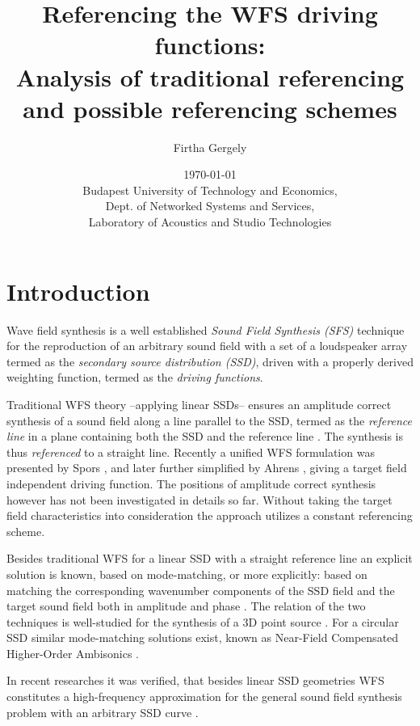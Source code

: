 \documentclass[12pt,a4paper]{article}
\title{Referencing the WFS driving functions:\\
Analysis of traditional referencing and possible referencing schemes}
\date{\today \\
Budapest University of Technology and Economics, \\ Dept. of Networked Systems and Services, \\ Laboratory of Acoustics and Studio Technologies}
\author{Firtha Gergely}
\begin{document}
\maketitle

\section{Introduction}

Wave field synthesis is a well established \emph{Sound Field Synthesis (SFS)} technique for the reproduction of an arbitrary sound field with a set of a loudspeaker array termed as the \emph{secondary source distribution (SSD)}, driven with a properly derived weighting function, termed as the \emph{driving functions}. 

Traditional WFS theory --applying linear SSDs-- ensures an amplitude correct synthesis of a sound field along a line parallel to the SSD, termed as the \emph{reference line} in a plane containing both the SSD and the reference line \cite{Berkhout1993:Acoustic_control_by_WFS, Berkhout1988, Verheijen1997:phd, Vogel1993:phd, Start1997:phd}. The synthesis is thus \emph{referenced} to a straight line. Recently a unified WFS formulation was presented by Spors \cite{Spors2008:WFSrevisited}, and later further simplified by Ahrens \cite{Ahrens2010phd, Ahrens2012}, giving a target field independent driving function. The positions of amplitude correct synthesis however has not been investigated in details so far. Without taking the target field characteristics into consideration the approach utilizes a constant referencing scheme.

Besides traditional WFS for a linear SSD with a straight reference line an explicit solution is known, based on mode-matching, or more explicitly: based on matching the corresponding wavenumber components of the SSD field and the target sound field both in amplitude and phase \cite{Ahrens2010a, Ahrens2010:Ambisonics_w_planar_linear}. The relation of the two techniques is well-studied for the synthesis of a 3D point source \cite{Spors2010:analysis_and_improvement}. For a circular SSD similar mode-matching solutions exist, known as Near-Field Compensated Higher-Order Ambisonics \cite{Ahrens2008:Analytical_Circ_Spherical_SFS}.

In recent researches it was verified, that besides linear SSD geometries WFS constitutes a high-frequency approximation for the general sound field synthesis problem with an arbitrary SSD curve \cite{Fazi2013:Equivalent_scattering, Zotter2013:uniqueness}.
\end{document}
